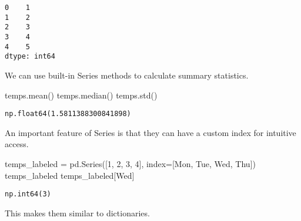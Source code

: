 \documentclass[
  letterpaper,
  DIV=11,
  numbers=noendperiod]{scrreprt}
\newenvironment{Shaded}{\begin{snugshade}}{\end{snugshade}}
\newcommand{\DecValTok}[1]{\textcolor[rgb]{0.68,0.00,0.00}{#1}}
\newcommand{\NormalTok}[1]{\textcolor[rgb]{0.00,0.23,0.31}{#1}}
\newcommand{\OperatorTok}[1]{\textcolor[rgb]{0.37,0.37,0.37}{#1}}
\newcommand{\StringTok}[1]{\textcolor[rgb]{0.13,0.47,0.30}{#1}}
\begin{document}
\begin{verbatim}
0    1
1    2
2    3
3    4
4    5
dtype: int64
\end{verbatim}

We can use built-in Series methods to calculate summary statistics.

\begin{Shaded}
\begin{Highlighting}[]
\NormalTok{temps.mean()}
\NormalTok{temps.median()}
\NormalTok{temps.std()}
\end{Highlighting}
\end{Shaded}

\begin{verbatim}
np.float64(1.5811388300841898)
\end{verbatim}

An important feature of Series is that they can have a custom index for
intuitive access.

\begin{Shaded}
\begin{Highlighting}[]
\NormalTok{temps\_labeled }\OperatorTok{=}\NormalTok{ pd.Series([}\DecValTok{1}\NormalTok{, }\DecValTok{2}\NormalTok{, }\DecValTok{3}\NormalTok{, }\DecValTok{4}\NormalTok{], index}\OperatorTok{=}\NormalTok{[}\StringTok{\textquotesingle{}Mon\textquotesingle{}}\NormalTok{, }\StringTok{\textquotesingle{}Tue\textquotesingle{}}\NormalTok{, }\StringTok{\textquotesingle{}Wed\textquotesingle{}}\NormalTok{, }\StringTok{\textquotesingle{}Thu\textquotesingle{}}\NormalTok{])}
\NormalTok{temps\_labeled}
\NormalTok{temps\_labeled[}\StringTok{\textquotesingle{}Wed\textquotesingle{}}\NormalTok{]}
\end{Highlighting}
\end{Shaded}

\begin{verbatim}
np.int64(3)
\end{verbatim}

This makes them similar to dictionaries.
\end{document}
